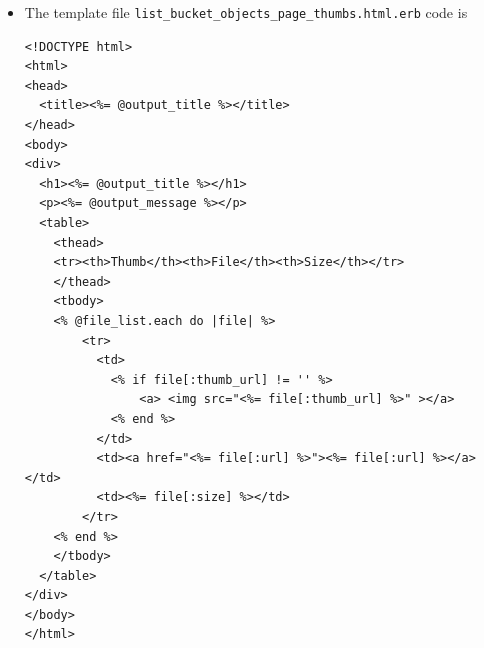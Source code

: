 \documentclass{beamer}
\begin{document}
\begin{frame}
\begin{itemize}
\begin{lstlisting}[escapechar=!]
require File.expand_path(File.dirname(__FILE__) + '/../config')
require File.expand_path(File.dirname(__FILE__) + '/book.inc.rb')

def get_file_list( s3, cloud_front, bucket_name, thumb_bucket_name )
  distribution = find_distribution_for_bucket cloud_front, bucket_name
  url = distribution ?  "https://#{distribution[:domain_name]}" : "#{S3_AMAZONAWS_URL}/#{bucket_name}"

  thumb_distribution = find_distribution_for_bucket cloud_front, thumb_bucket_name
  thumb_url = if thumb_distribution then
                 "https://#{thumb_distribution[:domain_name]}"
               else
                 "#{S3_AMAZONAWS_URL}/#{thumb_bucket_name}"
               end
  
  # access to objects in the buckets
  objects = get_bucket_objects s3, bucket_name
  thumb_objects = get_bucket_objects s3, thumb_bucket_name

  file_list = []
  objects.each do |object|
    key = object[:key]
    thumb_uri = thumb_objects.detect{|thumb_object| thumb_object[:key] == key}?  "#{thumb_url}/#{key}": ''

    file_list << { key: key, size: object[:size], url: "#{url}/#{key}", thumb_url: thumb_uri}
    return file_list if file_list.size > 10
  end unless objects.nil ?
  file_list
end

if __FILE__ == $0
  unless ARGV.size == 2
    puts "Usage: #{__FILE__} <BUCKET_NAME|-> <THUMB_BUCKET_NAME|->"
    exit 1
  end

  (bucket_name, thumb_bucket_name) = ARGV
  bucket_name = BOOK_BUCKET if bucket_name == '-'
  thumb_bucket_name = "#{BOOK_BUCKET}#{THUMB_BUCKET_SUFFIX}" if thumb_bucket_name == '-'

  # get an instance of the S3 interface using the default configuration
  s3 = AWS::S3.new

  # get an instance of the CloudFront interface using the default configuration
  cloud_front = AWS::CloudFront.new

  puts get_file_list( s3, cloud_front, bucket_name, thumb_bucket_name ).to_s
end
\end{lstlisting}

\item The template file \texttt{list\_bucket\_objects\_page\_thumbs.html.erb} code is
\lstset{language=Ruby, style=eclipse}
\begin{lstlisting}
<!DOCTYPE html>
<html>
<head>
  <title><%= @output_title %></title>
</head>
<body>
<div>
  <h1><%= @output_title %></h1>
  <p><%= @output_message %></p>
  <table>
    <thead>
    <tr><th>Thumb</th><th>File</th><th>Size</th></tr>
    </thead>
    <tbody>
    <% @file_list.each do |file| %>
        <tr>
          <td>
            <% if file[:thumb_url] != '' %>
                <a> <img src="<%= file[:thumb_url] %>" ></a>
            <% end %>
          </td>
          <td><a href="<%= file[:url] %>"><%= file[:url] %></a></td>
          <td><%= file[:size] %></td>
        </tr>
    <% end %>
    </tbody>
  </table>
</div>
</body>
</html>
\end{lstlisting}


\end{itemize}
\end{frame}
\end{document}
